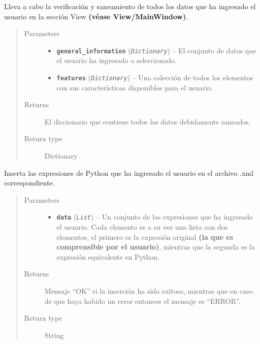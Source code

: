 \documentclass[class=report, crop=false]{standalone}
\begin{document}
\begin{fulllineitems}
\begin{fulllineitems}

Lleva a cabo la verificación y saneamiento de todos los datos
que ha ingresado el usuario en la sección View \textbf{(véase View/MainWindow)}.

\begin{quote}\begin{description}
\item[{Parameters}] \leavevmode\begin{itemize}
\item \textbf{\texttt{general\_information}} (\emph{\texttt{Dictionary}}) -- El conjunto de datos que el usuario ha ingresado o seleccionado.
\item \textbf{\texttt{features}} (\emph{\texttt{Dictionary}}) -- Una colección de todos los elementos con sus características disponibles para el usuario.
\end{itemize}
\item[{Returns}] \leavevmode
El diccionario que contiene todos los datos debidamente saneados.
\item[{Return type}] \leavevmode
Dictionary
\end{description}\end{quote}

\end{fulllineitems}

\begin{fulllineitems}

Inserta las expresiones de Python que ha ingresado
el usuario en el archivo .xml correspondiente.

\begin{quote}\begin{description}
\item[{Parameters}] \leavevmode\begin{itemize}
\item \textbf{\texttt{data}} (\emph{\texttt{List}}) -- Un conjunto de las expresiones que ha ingresado el usuario. Cada elemento es a su vez una lista con dos elementos, el primero es la expresión original \textbf{(la que es comprensible por el usuario)}, mientras que la segunda es la expresión equivalente en Python.
\end{itemize}
\item[{Returns}] \leavevmode
Mensaje ``OK'' si la inserción ha sido exitosa, mientras que en caso de que haya habido un error entonces el mensaje es ``ERROR''.
\item[{Return type}] \leavevmode
String
\end{description}\end{quote}

\end{fulllineitems}

\end{fulllineitems}
\end{document}
